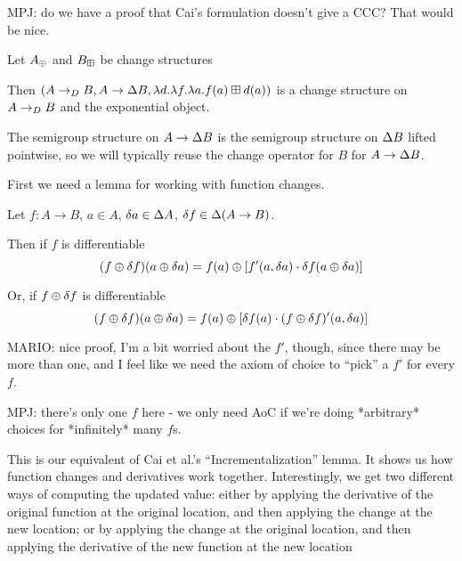MPJ: do we have a proof that Cai's formulation doesn't give a CCC? That would be
nice.

\begin{prop}[Exponentials]
\label{prop:exponentials}
  Let $A_\oplus$ and $B_\boxplus$ be change structures

  Then $(A \rightarrow_{D} B,A
    \rightarrow \Delta B,\lambda d. \lambda f. \lambda a. f(a) \boxplus
    d(a))$ is a change structure on $A \rightarrow_{D} B$ and the exponential object.

  The semigroup structure on $A \rightarrow \Delta B$ is the semigroup
  structure on $\Delta B$ lifted pointwise, so we will typically reuse the
  change operator for $B$ for $A \rightarrow \Delta B$.
\end{prop}

First we need a lemma for working with function changes.

\begin{prop}[Incrementalization]
\label{prop:incrementalization}
  Let $f: A \rightarrow B$, $a \in A$, $\delta a \in
  \Delta A$, $\delta f \in \Delta (A \rightarrow B)$.

  Then if $f$ is differentiable
  $$(f \oplus \delta f)(a \oplus \delta a) = f(a) \oplus 
  \left[f'(a, \delta a) \cdot \delta f(a \oplus \delta a) \right]$$
  
  Or, if $f \oplus \delta f$ is differentiable
  $$(f \oplus \delta f)(a \oplus \delta a) = f(a) \oplus 
  \left[\delta f(a) \cdot (f \oplus \delta f)'(a, \delta a) \right]$$

\end{prop}

MARIO: nice proof, I'm a bit worried about the $f'$, though, since there may be more than one,
and I feel like we need the axiom of choice to ``pick'' a $f'$ for every $f$.

MPJ: there's only one $f$ here - we only need AoC if we're doing *arbitrary*
choices for *infinitely* many $f$s.

This is our equivalent of Cai et al.'s ``Incrementalization'' lemma. It shows us
how function changes and derivatives work together. Interestingly, we get two
different ways of computing the updated value: either by applying the derivative
of the original function at the original location, and then applying the change at the new location; or
by applying the change at the original location, and then applying the
derivative of the new function at the new location

